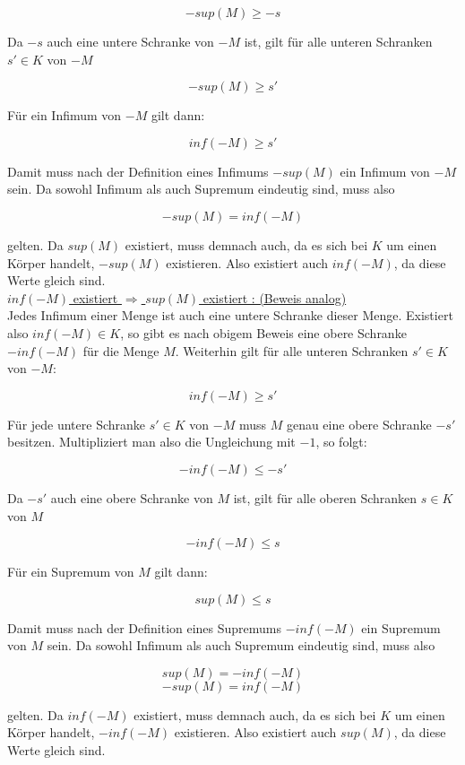 \documentclass[11pt, a4paper]{article}
\begin{document}
		\[ -sup(M) \geq -s \]

		Da $-s$ auch eine untere Schranke von $-M$ ist, gilt für alle unteren Schranken $s' \in K$ von $-M$

		\[ -sup(M) \geq s' \]

		Für ein Infimum von $-M$ gilt dann:

		\[ inf(-M) \geq s' \]

		Damit muss nach der Definition eines Infimums $-sup(M)$ ein Infimum von $-M$ sein. Da sowohl Infimum als auch Supremum eindeutig sind, muss also

		\[ -sup(M) = inf(-M) \]

		gelten. Da $sup(M)$ existiert, muss demnach auch, da es sich bei $K$ um einen Körper handelt, $-sup(M)$ existieren. Also existiert auch $inf(-M)$, da diese Werte gleich sind. \\



		\underline{$inf(-M)$ existiert $\Rightarrow$ $sup(M)$ existiert : (Beweis analog)} \\

		Jedes Infimum einer Menge ist auch eine untere Schranke dieser Menge. Existiert also $inf(-M) \in K$, so gibt es nach obigem Beweis eine obere Schranke $-inf(-M)$ für die Menge $M$.
		Weiterhin gilt für alle unteren Schranken $s' \in K$ von $-M$:

		\[ inf(-M) \geq s' \]

		Für jede untere Schranke $s' \in K$ von $-M$ muss $M$ genau eine obere Schranke $-s'$ besitzen.
		Multipliziert man also die Ungleichung mit $-1$, so folgt:

		\[ -inf(-M) \leq -s' \]

		Da $-s'$ auch eine obere Schranke von $M$ ist, gilt für alle oberen Schranken $s \in K$ von $M$

		\[ -inf(-M) \leq s \]

		Für ein Supremum von $M$ gilt dann:

		\[ sup(M) \leq s \]

		Damit muss nach der Definition eines Supremums $-inf(-M)$ ein Supremum von $M$ sein. Da sowohl Infimum als auch Supremum eindeutig sind, muss also

		\[ sup(M) = -inf(-M) \]
		\[ -sup(M) = inf(-M) \]

		gelten. Da $inf(-M)$ existiert, muss demnach auch, da es sich bei $K$ um einen Körper handelt, $-inf(-M)$ existieren. Also existiert auch $sup(M)$, da diese Werte gleich sind.\\
\end{document}
